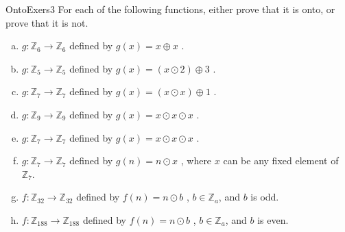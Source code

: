\begin{exercise}{OntoExers3}
For each of the following  functions, either prove that it is onto, or prove that it is not.
\begin{enumerate}[(a)]
\item \label{modular_m30}
 $g \colon {\mathbb Z}_6 \to {\mathbb Z}_{6}$ defined by $g(x) =  x \oplus x$ .
\item \label{modular_m3}
 $g \colon {\mathbb Z}_5 \to {\mathbb Z}_{5}$ defined by $g(x) =  (x \odot 2) \oplus 3$ .
\item 
 $g \colon {\mathbb Z}_7 \to {\mathbb Z}_7$ defined by $g(x)= (x \odot x) \oplus 1 $ .
\item 
 $g \colon {\mathbb Z}_9 \to {\mathbb Z}_9$ defined by $g(x)= x \odot x \odot x$ .
\item 
 $g \colon {\mathbb Z}_7 \to {\mathbb Z}_7$ defined by $g(x)= x \odot x \odot x$ .
\item 
 $g \colon {\mathbb Z}_7 \to {\mathbb Z}_7$ defined by $g(n)= n \odot x$ , where $x$ can be any 
fixed element of ${\mathbb Z}_7$.
\item
 $f \colon {\mathbb Z}_{32} \to {\mathbb Z}_{32}$ defined by $f(n)= n \odot b$ ,  $b \in {\mathbb Z}_a$, and $b$ is odd. 
\item
 $f \colon {\mathbb Z}_{188} \to {\mathbb Z}_{188}$ defined by $f(n)= n \odot b$ ,  $b \in {\mathbb Z}_a$, and $b$ is even. 

\end{enumerate}
\end{exercise}



